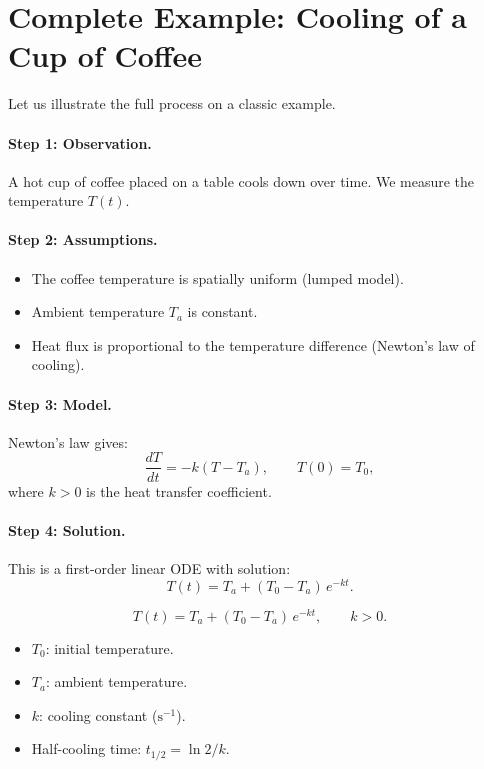 \section{Complete Example: Cooling of a Cup of Coffee}
\label{sec:coffee}

Let us illustrate the full process on a classic example.

\paragraph{Step 1: Observation.}
A hot cup of coffee placed on a table cools down over time.  We measure
the temperature $T(t)$.

\paragraph{Step 2: Assumptions.}
\begin{itemize}
  \item The coffee temperature is spatially uniform (lumped model).
  \item Ambient temperature $T_a$ is constant.
  \item Heat flux is proportional to the temperature difference
    (Newton's law of cooling).
\end{itemize}

\paragraph{Step 3: Model.}
Newton's law gives:
\[
  \frac{dT}{dt} = -k(T - T_a), \qquad T(0)=T_0,
\]
where $k>0$ is the heat transfer coefficient.

\paragraph{Step 4: Solution.}
This is a first-order linear ODE with solution:
\[
  T(t) = T_a + (T_0 - T_a)\,e^{-kt}.
\]

\begin{keyformulas}[title=\textbf{Newton's Law of Cooling}]
\[
  T(t) = T_a + (T_0 - T_a)\,e^{-kt}, \qquad k > 0.
\]
\begin{itemize}
  \item $T_0$: initial temperature.
  \item $T_a$: ambient temperature.
  \item $k$: cooling constant ($\mathrm{s}^{-1}$).
  \item Half-cooling time: $t_{1/2} = \ln 2 / k$.
\end{itemize}
\end{keyformulas}

